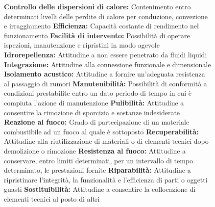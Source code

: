 \begin{figure}[p]
{\textbf{Controllo delle dispersioni di calore:} Contenimento entro determinati livelli delle perdite di calore per conduzione, convezione e irraggiamento
\textbf{Efficienza:} Capacità costante di rendimento nel funzionamento
\textbf{Facilità di intervento:} Possibilità di operare ispezioni, manutenzione e ripristini in modo agevole
\textbf{Idrorepellenza:} Attitudine a non essere penetrato da fluidi liquidi
\textbf{Integrazione:} Attitudine alla connessione funzionale e dimensionale
\textbf{Isolamento acustico:} Attitudine a fornire un'adeguata resistenza al passaggio di rumori
\textbf{Manutenibilità:} Possibilità di conformità a condizioni prestabilite entro un dato periodo di tempo in cui è compiuta l'azione di manutenzione
\textbf{Pulibilità:} Attitudine a consentire la rimozione di sporcizia e sostanze indesiderate
\textbf{Reazione al fuoco:} Grado di partecipazione di un materiale combustibile ad un fuoco al quale è sottoposto
\textbf{Recuperabilità:} Attitudine alla riutilizzazione di materiali o di elementi tecnici dopo demolizione o rimozione
\textbf{Resistenza al fuoco:} Attitudine a conservare, entro limiti determinati, per un intervallo di tempo determinato, le prestazioni fornite
\textbf{Riparabilità:} Attitudine a ripristinare l'integrità, la funzionalità e l'efficienza di parti o oggetti guasti 
\textbf{Sostituibilità:} Attitudine a consentire la collocazione di elementi tecnici al posto di altri}
\label{fig:AnalisiValore}
\end{figure}